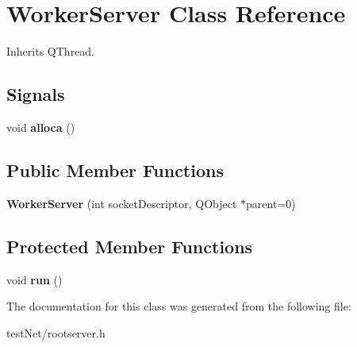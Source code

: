\hypertarget{class_worker_server}{\section{Worker\-Server Class Reference}
\label{class_worker_server}
}


Inherits Q\-Thread.

\subsection*{Signals}
\begin{DoxyCompactItemize}
\item 
\hypertarget{class_worker_server_a0ba45f59bc12f31cc2adbe8d0d71df32}{void {\bfseries alloca} ()}\label{class_worker_server_a0ba45f59bc12f31cc2adbe8d0d71df32}

\end{DoxyCompactItemize}
\subsection*{Public Member Functions}
\begin{DoxyCompactItemize}
\item 
\hypertarget{class_worker_server_ac81965042a951a11e282d55aa11bf2bc}{{\bfseries Worker\-Server} (int socket\-Descriptor, Q\-Object $\ast$parent=0)}\label{class_worker_server_ac81965042a951a11e282d55aa11bf2bc}

\end{DoxyCompactItemize}
\subsection*{Protected Member Functions}
\begin{DoxyCompactItemize}
\item 
\hypertarget{class_worker_server_a828583ef200eadb6c90a9af0054c48e0}{void {\bfseries run} ()}\label{class_worker_server_a828583ef200eadb6c90a9af0054c48e0}

\end{DoxyCompactItemize}


The documentation for this class was generated from the following file\-:\begin{DoxyCompactItemize}
\item 
test\-Net/rootserver.\-h\end{DoxyCompactItemize}
